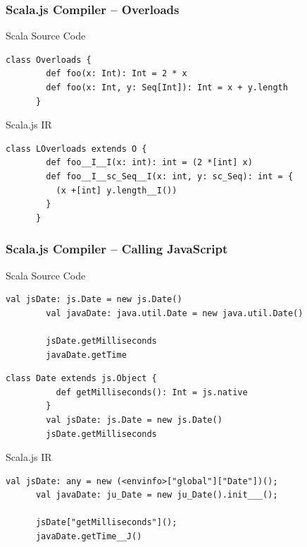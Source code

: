 \documentclass{beamer}
\begin{document}
\begin{frame}[fragile]
  \frametitle{Scala.js Compiler -- Overloads}

  \begin{block}{Scala Source Code}
    \begin{lstlisting}[gobble=6]
      class Overloads {
        def foo(x: Int): Int = 2 * x
        def foo(x: Int, y: Seq[Int]): Int = x + y.length
      }
    \end{lstlisting}
  \end{block}

  \pause

  \begin{block}{Scala.js IR}
    \begin{lstlisting}[gobble=6]
      class LOverloads extends O {
        def foo__I__I(x: int): int = (2 *[int] x)
        def foo__I__sc_Seq__I(x: int, y: sc_Seq): int = {
          (x +[int] y.length__I())
        }
      }
    \end{lstlisting}
  \end{block}

\end{frame}

\begin{frame}[fragile]
  \frametitle{Scala.js Compiler -- Calling JavaScript}

  \begin{block}{Scala Source Code}
    \begin{overprint}
      \begin{lstlisting}[gobble=8]
        val jsDate: js.Date = new js.Date()
        val javaDate: java.util.Date = new java.util.Date()

        jsDate.getMilliseconds
        javaDate.getTime
      \end{lstlisting}

      \begin{lstlisting}[gobble=8]
        class Date extends js.Object {
          def getMilliseconds(): Int = js.native
        }
        val jsDate: js.Date = new js.Date()
        jsDate.getMilliseconds
      \end{lstlisting}
    \end{overprint}
  \end{block}

  \pause

  \begin{block}{Scala.js IR}
    \begin{lstlisting}[gobble=6]
      val jsDate: any = new (<envinfo>["global"]["Date"])();
      val javaDate: ju_Date = new ju_Date().init___();

      jsDate["getMilliseconds"]();
      javaDate.getTime__J()
    \end{lstlisting}
  \end{block}

\end{frame}
\end{document}
